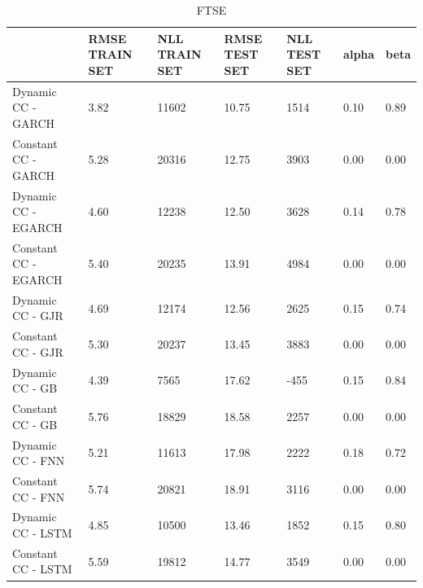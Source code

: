 \documentclass[a4paper, oneside]{discothesis}
\begin{document}
\begin{table}[!ht]
    \centering
    \scriptsize
    \begin{tabular}{|p{3.5cm}||p{1.1cm}|p{1.1cm}|p{1.1cm}|p{1.1cm}|p{1.1cm}|p{1.1cm}|}
    \hline
         & RMSE TRAIN SET & NLL TRAIN SET & RMSE TEST SET & NLL TEST SET & alpha & beta \\ \hline
        Dynamic CC - GARCH & 3.82 & 11602 & 10.75 & 1514 & 0.10 & 0.89 \\ \hline
        Constant CC - GARCH & 5.28 & 20316 & 12.75 & 3903& 0.00 & 0.00 \\ \hline
        Dynamic CC - EGARCH & 4.60 & 12238 & 12.50 & 3628 & 0.14 & 0.78 \\ \hline
        Constant CC - EGARCH & 5.40 & 20235 & 13.91 & 4984 & 0.00 & 0.00 \\ \hline
        Dynamic CC - GJR & 4.69 & 12174 & 12.56 & 2625 & 0.15 & 0.74 \\ \hline
        Constant CC - GJR & 5.30 & 20237 & 13.45 & 3883& 0.00 & 0.00 \\ \hline
        Dynamic CC - GB & 4.39 & 7565 & 17.62 & -455 & 0.15 & 0.84 \\ \hline
        Constant CC - GB & 5.76 & 18829 & 18.58 & 2257 & 0.00 & 0.00 \\ \hline
        Dynamic CC - FNN & 5.21 & 11613 & 17.98 & 2222 & 0.18 & 0.72 \\ \hline
        Constant CC - FNN & 5.74 & 20821 & 18.91 & 3116 & 0.00 & 0.00 \\ \hline
        Dynamic CC - LSTM & 4.85 & 10500 & 13.46 & 1852 & 0.15 & 0.80 \\ \hline
        Constant CC - LSTM & 5.59 & 19812 & 14.77 & 3549 & 0.00 & 0.00 \\ \hline
    \end{tabular}
    \normalsize
    \caption{FTSE}
\end{table}
\end{document}
